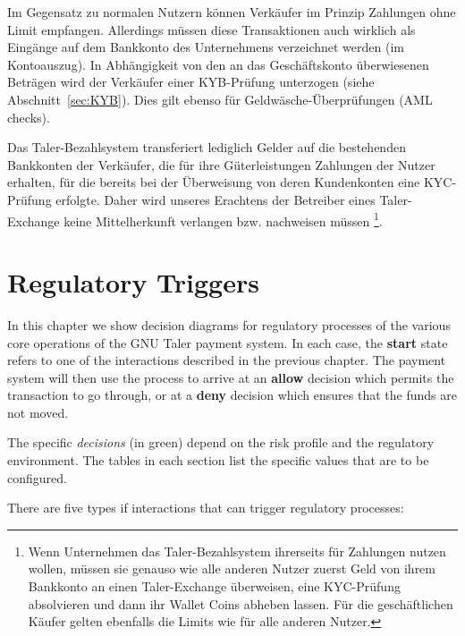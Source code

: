 \documentclass[10pt,a4paper,oneside]{book}
\begin{document}
Im Gegensatz zu normalen Nutzern k\"onnen Verk\"aufer im Prinzip
Zahlungen ohne Limit empfangen. Allerdings m\"ussen diese Transaktionen
auch wirklich als Eing\"ange auf dem Bankkonto des Unternehmens verzeichnet
werden (im Kontoauszug). In Abh\"angigkeit von den an das Gesch\"aftskonto
\"uberwiesenen Betr\"agen wird der Verk\"aufer einer KYB-Pr\"ufung unterzogen
(siehe Abschnitt~\ref{sec:KYB}). Dies gilt ebenso f\"ur
Geldw\"asche-\"Uberpr\"ufungen (AML checks).

Das Taler-Bezahlsystem transferiert lediglich Gelder auf die bestehenden
Bankkonten der Verk\"aufer, die f\"ur ihre G\"uterleistungen Zahlungen
der Nutzer erhalten, f\"ur die bereits bei der \"Uberweisung von deren
Kundenkonten eine KYC-Pr\"ufung erfolgte. Daher wird unseres Erachtens
der Betreiber eines Taler-Exchange keine Mittelherkunft verlangen bzw.
nachweisen m\"ussen
\footnote{Wenn Unternehmen das Taler-Bezahlsystem ihrerseits f\"ur
Zahlungen nutzen wollen, m\"ussen sie genauso wie alle anderen Nutzer
zuerst Geld von ihrem Bankkonto an einen Taler-Exchange \"uberweisen,
eine KYC-Pr\"ufung absolvieren und dann ihr Wallet Coins abheben lassen.
F\"ur die gesch\"aftlichen K\"aufer gelten ebenfalls die Limits wie
f\"ur alle anderen Nutzer.}.












\chapter{Regulatory Triggers} \label{chap:triggers}

In this chapter we show decision diagrams for regulatory processes of the
various core operations of the GNU Taler payment system.  In each case, the
{\bf start} state refers to one of the interactions described in the previous
chapter.  The payment system will then use the process to arrive at an {\bf
  allow} decision which permits the transaction to go through, or at a {\bf
  deny} decision which ensures that the funds are not moved.

The specific {\em decisions} (in green) depend on the risk profile and the
regulatory environment. The tables in each section list the specific values
that are to be configured.

There are five types if interactions that can trigger regulatory processes:
\end{document}
